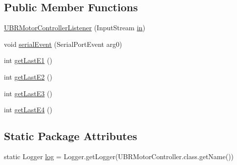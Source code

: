 \subsection*{Public Member Functions}
\begin{DoxyCompactItemize}
\item 
\hyperlink{classrob_o_s2_1_1hardware_1_1ubr_1_1_u_b_r_motor_controller_listener_aeec13602e53e21f2bf36567195498118}{UBRMotorControllerListener} (InputStream \hyperlink{classrob_o_s2_1_1hardware_1_1ubr_1_1_u_b_r_motor_controller_listener_a45a48cca4f8ba67eb9566eea4aa8db70}{in})
\item 
void \hyperlink{classrob_o_s2_1_1hardware_1_1ubr_1_1_u_b_r_motor_controller_listener_aca59d4c966d3022d600c17848c88722b}{serialEvent} (SerialPortEvent arg0)
\item 
int \hyperlink{classrob_o_s2_1_1hardware_1_1ubr_1_1_u_b_r_motor_controller_listener_a1eb4635a2ec521a5bf071221c02716c5}{getLastE1} ()
\item 
int \hyperlink{classrob_o_s2_1_1hardware_1_1ubr_1_1_u_b_r_motor_controller_listener_a94ec47599565e91a0c3ab0d9a29c15d7}{getLastE2} ()
\item 
int \hyperlink{classrob_o_s2_1_1hardware_1_1ubr_1_1_u_b_r_motor_controller_listener_a83c4fbfea2e9c2b1957f0493c96a9255}{getLastE3} ()
\item 
int \hyperlink{classrob_o_s2_1_1hardware_1_1ubr_1_1_u_b_r_motor_controller_listener_a9e5534a1b501d71fd551f0bfede96269}{getLastE4} ()
\end{DoxyCompactItemize}
\subsection*{Static Package Attributes}
\begin{DoxyCompactItemize}
\item 
static Logger \hyperlink{classrob_o_s2_1_1hardware_1_1ubr_1_1_u_b_r_motor_controller_listener_afd1f1f6b2c2a33a5bb26d871301c3971}{log} = Logger.getLogger(UBRMotorController.class.getName())
\end{DoxyCompactItemize}
